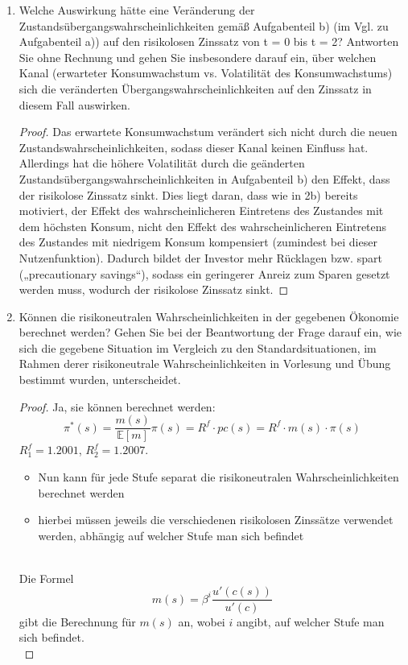 \documentclass[12pt]{extreport} %
\theoremstyle{named}
\theoremstyle{nnamed}
\theoremstyle{itshape}
\theoremstyle{normal}
\begin{document}
\begin{enumerate}
\begin{proof}
		\end{proof}
	\item Welche Auswirkung hätte eine Veränderung der Zustandsübergangswahrscheinlichkeiten gemäß Aufgabenteil b) (im Vgl. zu Aufgabenteil a)) auf den risikolosen Zinssatz von t = 0 bis t = 2? Antworten Sie ohne Rechnung und gehen Sie insbesondere darauf ein, über welchen Kanal (erwarteter Konsumwachstum vs. Volatilität des Konsumwachstums) sich die veränderten Übergangswahrscheinlichkeiten auf den Zinssatz in diesem Fall auswirken.
		\begin{proof}
			Das erwartete Konsumwachstum verändert sich nicht durch die neuen Zustandswahrscheinlichkeiten, sodass dieser Kanal keinen Einfluss hat. Allerdings hat die höhere Volatilität durch die geänderten Zustandsübergangswahrscheinlichkeiten in Aufgabenteil b) den Effekt, dass der risikolose Zinssatz sinkt. Dies liegt daran, dass wie in 2b) bereits motiviert, der Effekt  des wahrscheinlicheren Eintretens des Zustandes mit dem höchsten Konsum, nicht den Effekt des wahrscheinlicheren Eintretens des Zustandes mit niedrigem Konsum kompensiert (zumindest bei dieser Nutzenfunktion). Dadurch bildet der Investor mehr Rücklagen  bzw. spart („precautionary savings“), sodass ein geringerer Anreiz zum Sparen gesetzt werden muss, wodurch der risikolose Zinssatz sinkt.  
		\end{proof}
	\item Können die risikoneutralen Wahrscheinlichkeiten in der gegebenen Ökonomie berechnet werden? Gehen Sie bei der Beantwortung der Frage darauf ein, wie sich die gegebene Situation im Vergleich zu den Standardsituationen, im Rahmen derer risikoneutrale Wahrscheinlichkeiten in Vorlesung und Übung bestimmt wurden, unterscheidet.
		\begin{proof}
			Ja, sie können berechnet werden:
			$$ \pi^*(s) = \frac{m(s)}{\mathbb{E}[m]} \pi(s) = R^f \cdot pc(s) = R^f \cdot m(s) \cdot \pi(s) $$
			$R^f_1 = 1.2001$, $R^f_2 = 1.2007$.
			\begin{itemize}
				\item Nun kann für jede Stufe separat die risikoneutralen Wahrscheinlichkeiten berechnet werden
				\item hierbei müssen jeweils die verschiedenen risikolosen Zinssätze verwendet werden, abhängig auf welcher Stufe man sich befindet
			\end{itemize} ~\\
			Die Formel
			$$ m(s) = \beta^i \frac{u'(c(s))}{u'(c)} $$
			gibt die Berechnung für $m(s)$ an, wobei $i$ angibt, auf welcher Stufe man sich befindet. ~\\
			

\end{proof}
\end{enumerate}
\end{document}
